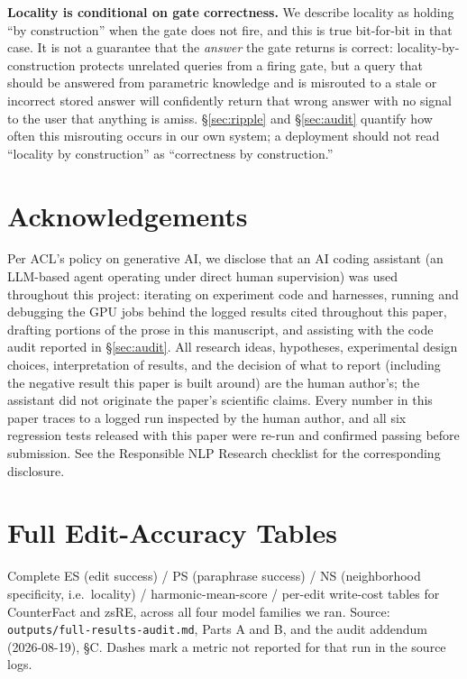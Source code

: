 \documentclass[11pt]{article}
\begin{document}
\textbf{Locality is conditional on gate correctness.} We describe locality
as holding ``by construction'' when the gate does not fire, and this is true
bit-for-bit in that case. It is not a guarantee that the \emph{answer} the
gate returns is correct: locality-by-construction protects unrelated
queries from a firing gate, but a query that should be answered from
parametric knowledge and is misrouted to a stale or incorrect stored answer
will confidently return that wrong answer with no signal to the user that
anything is amiss. \S\ref{sec:ripple} and \S\ref{sec:audit} quantify how
often this misrouting occurs in our own system; a deployment should not read
``locality by construction'' as ``correctness by construction.''

\section*{Acknowledgements}

Per ACL's policy on generative AI, we disclose that an AI coding assistant
(an LLM-based agent operating under direct human supervision) was used
throughout this project: iterating on experiment code and harnesses,
running and debugging the GPU jobs behind the logged results cited
throughout this paper, drafting portions of the prose in this manuscript,
and assisting with the code audit reported in \S\ref{sec:audit}. All
research ideas, hypotheses, experimental design choices, interpretation of
results, and the decision of what to report (including the negative result
this paper is built around) are the human author's; the assistant did not
originate the paper's scientific claims. Every number in this paper traces
to a logged run inspected by the human author, and all six regression tests
released with this paper were re-run and confirmed passing before
submission. See the Responsible NLP Research checklist for the corresponding
disclosure.



\appendix

\section{Full Edit-Accuracy Tables}
\label{sec:appendix-tables}

Complete ES (edit success) / PS (paraphrase success) / NS (neighborhood
specificity, i.e.\ locality) / harmonic-mean-score / per-edit write-cost
tables for CounterFact and zsRE, across all four model families we ran.
Source: \texttt{outputs/full-results-audit.md}, Parts A and B, and
the audit addendum (2026-08-19), \S C.
Dashes mark a metric not reported for that run in the source logs.
\end{document}
